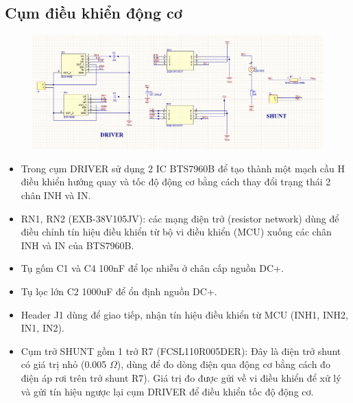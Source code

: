 \subsection{Cụm điều khiển động cơ}
\begin{figure}[H]
    \centering
    \includegraphics[width=1\textwidth]{pictures/driver.png}
\end{figure}
\begin{itemize}
    \item Trong cụm DRIVER sử dụng 2 IC BTS7960B để tạo thành một mạch cầu H điều khiển hướng quay và tốc độ động cơ bằng cách thay đổi trạng thái 2 chân INH và IN.
    \item RN1, RN2 (EXB-38V105JV): các mạng điện trở (resistor network) dùng để điều chỉnh tín hiệu điều khiển từ bộ vi điều khiển (MCU) xuống các chân INH và IN của BTS7960B.
    \item Tụ gốm C1 và C4 100nF để lọc nhiễu ở chân cấp nguồn DC+.
    \item Tụ lọc lớn C2 1000uF để ổn định nguồn DC+.
    \item Header J1 dùng để giao tiếp, nhận tín hiệu điều khiển từ MCU (INH1, INH2, IN1, IN2).
    \item Cụm trở SHUNT gồm 1 trở R7 (FCSL110R005DER): Đây là điện trở shunt có giá trị nhỏ (0.005 $\Omega$), dùng để đo dòng điện qua động cơ bằng cách đo điện áp rơi trên trở shunt R7). Giá trị đo được gửi về vi điều khiển để xử lý và gửi tín hiệu ngược lại cụm 
    DRIVER để điều khiển tốc độ động cơ.
\end{itemize}

